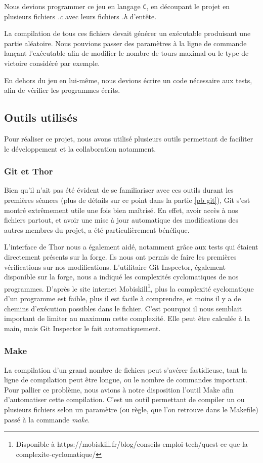 \documentclass[a4paper]{article}
\begin{document}
Nous devions programmer ce jeu en langage \verb|C|, en découpant le projet en plusieurs fichiers \emph{.c} avec leurs fichiers \emph{.h} d'entête.

La compilation de tous ces fichiers devait générer un exécutable produisant une partie aléatoire. Nous pouvions passer des paramètres à la ligne de commande lançant l'exécutable afin de modifier le nombre de tours maximal ou le type de victoire considéré par exemple.

En dehors du jeu en lui-même, nous devions écrire un code nécessaire aux tests, afin de vérifier les programmes écrits.

\subsection{Outils utilisés}
\label{outils}
Pour réaliser ce projet, nous avons utilisé plusieurs outils permettant de faciliter le développement et la collaboration notamment.

\subsubsection{Git et Thor}
\label{git}
Bien qu'il n'ait pas été évident de se familiariser avec ces outils durant les premières séances (plus de détails sur ce point dans la partie \ref{pb git}), Git s'est montré extrêmement utile une fois bien maîtrisé. En effet, avoir accès à nos fichiers partout, et avoir une mise à jour automatique des modifications des autres membres du projet, a été particulièrement bénéfique.

L'interface de Thor nous a également aidé, notamment grâce aux tests qui étaient directement présents sur la forge. Ils nous ont permis de faire les premières vérifications sur nos modifications. L'utilitaire Git Inspector, également disponible sur la forge, nous a indiqué les complexités cyclomatiques de nos programmes. D'après le site internet Mobiskill\footnote{Disponible à https://mobiskill.fr/blog/conseils-emploi-tech/quest-ce-que-la-complexite-cyclomatique/}, plus la complexité cyclomatique d'un programme est faible, plus il est facile à comprendre, et moins il y a de chemins d'exécution possibles dans le fichier. C'est pourquoi il nous semblait important de limiter au maximum cette complexité. Elle peut être calculée à la main, mais Git Inspector le fait automatiquement.

\subsubsection{Make}
\label{makefile}
La compilation d'un grand nombre de fichiers peut s'avérer fastidieuse, tant la ligne de compilation peut être longue, ou le nombre de commandes important. Pour pallier ce problème, nous avions à notre disposition l'outil Make afin d'automatiser cette compilation. C'est un outil permettant de compiler un ou plusieurs fichiers selon un paramètre (ou règle, que l'on retrouve dans le Makefile) passé à la commande \emph{make}.
\end{document}
